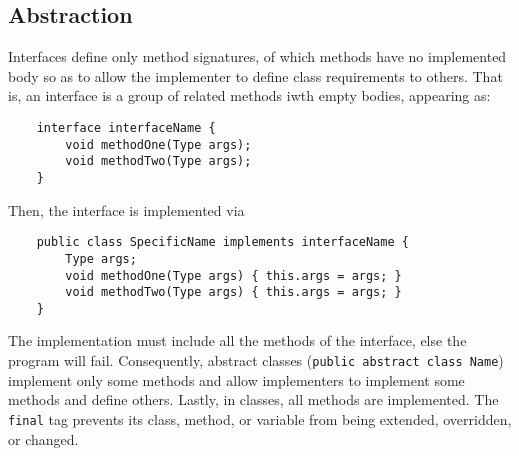 \documentclass[letterpaper, openany, justified]{tufte-book}
\newcommand{\cd}[1]{\lstinline{#1}}
\begin{document}
\begin{fullwidth}
\section{Abstraction}
Interfaces define only method signatures, of which methods have no implemented body so as to allow the implementer to define class requirements to others. That is, an interface is a group of related methods iwth empty bodies, appearing as:
\begin{lstlisting}
    interface interfaceName {
        void methodOne(Type args);
        void methodTwo(Type args);
    }
\end{lstlisting}
Then, the interface is implemented via
\begin{lstlisting}
    public class SpecificName implements interfaceName {
        Type args;
        void methodOne(Type args) { this.args = args; }
        void methodTwo(Type args) { this.args = args; }
    }
\end{lstlisting}
The implementation must include all the methods of the interface, else the program will fail. Consequently, abstract classes (\cd{public abstract class Name}) implement only some methods and allow implementers to implement some methods and define others. Lastly, in classes, all methods are implemented. The \cd{final} tag prevents its class, method, or variable from being extended, overridden, or changed.


\end{fullwidth}
\end{document}
